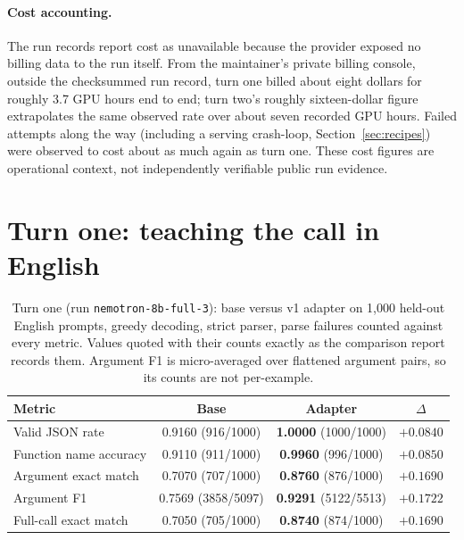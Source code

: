 \documentclass{article}
\begin{document}
\paragraph{Cost accounting.}
The run records report cost as unavailable because the provider exposed no billing data to the run itself. From the maintainer's private billing console, outside the checksummed run record, turn one billed about eight dollars for roughly 3.7 GPU hours end to end; turn two's roughly sixteen-dollar figure extrapolates the same observed rate over about seven recorded GPU hours. Failed attempts along the way (including a serving crash-loop, Section~\ref{sec:recipes}) were observed to cost about as much again as turn one. These cost figures are operational context, not independently verifiable public run evidence.

\section{Turn one: teaching the call in English}
\label{sec:turn1}

\begin{table}[t]
  \caption{Turn one (run \texttt{nemotron-8b-full-3}): base versus v1 adapter on 1{,}000 held-out English prompts, greedy decoding, strict parser, parse failures counted against every metric. Values quoted with their counts exactly as the comparison report records them. Argument F1 is micro-averaged over flattened argument pairs, so its counts are not per-example.}
  \label{tab:v1}
  \centering
  \small
  \begin{tabular}{lccc}
    \toprule
    Metric & Base & Adapter & $\Delta$ \\
    \midrule
    Valid JSON rate & 0.9160 \scriptsize(916/1000) & \textbf{1.0000} \scriptsize(1000/1000) & $+0.0840$ \\
    Function name accuracy & 0.9110 \scriptsize(911/1000) & \textbf{0.9960} \scriptsize(996/1000) & $+0.0850$ \\
    Argument exact match & 0.7070 \scriptsize(707/1000) & \textbf{0.8760} \scriptsize(876/1000) & $+0.1690$ \\
    Argument F1 & 0.7569 \scriptsize(3858/5097) & \textbf{0.9291} \scriptsize(5122/5513) & $+0.1722$ \\
    Full-call exact match & 0.7050 \scriptsize(705/1000) & \textbf{0.8740} \scriptsize(874/1000) & $+0.1690$ \\
    \bottomrule
  \end{tabular}
\end{table}
\end{document}
